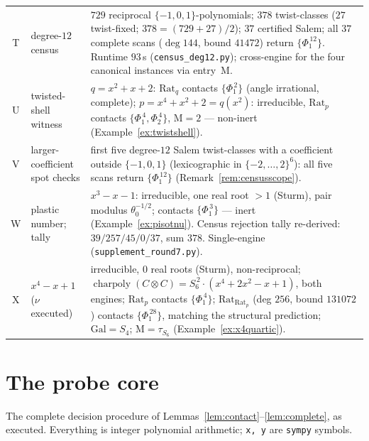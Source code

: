 \documentclass[11pt]{article}
\theoremstyle{plain}
\theoremstyle{definition}
\theoremstyle{remark}
\newcommand{\Mah}{\mathrm{M}}
\newcommand{\Rat}{\mathrm{Rat}}
\begin{document}
\begin{center}
\begin{tabular}{clp{9.2cm}}
T & degree-$12$ census & $729$ reciprocal $\{-1,0,1\}$-polynomials; $378$
twist-classes ($27$ twist-fixed; $378=(729+27)/2$); $37$ certified Salem;
all $37$ complete scans ($\deg144$, bound $41472$) return
$\{\Phi_1^{\,12}\}$. Runtime $93$\,s (\texttt{census\_deg12.py});
cross-engine for the four canonical instances via entry~M.\\[2pt]
U & twisted-shell witness & $q=x^2+x+2$: $\Rat_q$ contacts
$\{\Phi_1^{\,2}\}$ (angle irrational, complete); $p=x^4+x^2+2=q(x^2)$:
irreducible, $\Rat_p$ contacts $\{\Phi_1^{\,4},\Phi_2^{\,4}\}$,
$\Mah=2$ --- non-inert (Example~\ref{ex:twistshell}).\\[2pt]
V & larger-coefficient spot checks & first five degree-$12$ Salem
twist-classes with a coefficient outside $\{-1,0,1\}$ (lexicographic in
$\{-2,\dots,2\}^6$): all five scans return $\{\Phi_1^{\,12}\}$
(Remark~\ref{rem:censusscope}).\\[2pt]
W & plastic number; tally & $x^3-x-1$: irreducible, one real root $>1$
(Sturm), pair modulus $\theta_0^{-1/2}$; contacts $\{\Phi_1^{\,3}\}$ ---
inert (Example~\ref{ex:pisotnu}). Census rejection tally re-derived:
$39/257/45/0/37$, sum $378$. Single-engine
(\texttt{supplement\_round7.py}).\\[2pt]
X & $x^4-x+1$ ($\nu$ executed) & irreducible, $0$ real roots (Sturm),
non-reciprocal; $\operatorname{charpoly}(C\otimes C)
=S_6^{\,2}\cdot(x^4+2x^2-x+1)$, both engines; $\Rat_p$ contacts
$\{\Phi_1^{\,4}\}$; $\Rat_{\Rat_p}$ (deg $256$, bound $131072$) contacts
$\{\Phi_1^{\,28}\}$, matching the structural prediction;
$\mathrm{Gal}=S_4$; $\Mah=\tau_{S_6}$ (Example~\ref{ex:x4quartic}).\\
\hline
\end{tabular}
\end{center}

\section{The probe core}\label{app:probe}

The complete decision procedure of
Lemmas~\ref{lem:contact}--\ref{lem:complete}, as executed. Everything is
integer polynomial arithmetic; \texttt{x, y} are \texttt{sympy} symbols.
\end{document}

